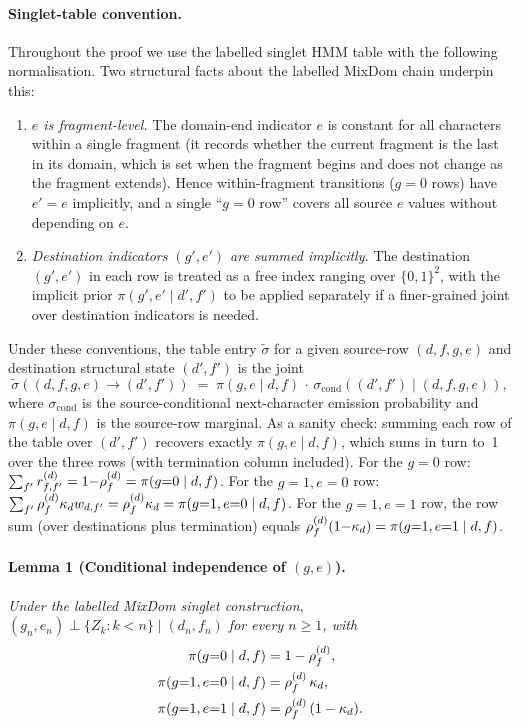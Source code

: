\paragraph{Singlet-table convention.}
Throughout the proof we use the labelled singlet HMM table with the
following normalisation. Two structural
facts about the labelled MixDom chain underpin this:
\begin{enumerate}[nosep, label=(\alph*)]
\item \emph{$e$ is fragment-level.} The domain-end indicator $e$
is constant for all characters within a single fragment (it
records whether the current fragment is the last in its domain,
which is set when the fragment begins and does not change as the
fragment extends). Hence within-fragment transitions ($g{=}0$
rows) have $e' = e$ implicitly, and a single ``$g{=}0$ row''
covers all source $e$ values without depending on $e$.
\item \emph{Destination indicators $(g', e')$ are summed implicitly.}
The destination $(g', e')$ in each row is treated as a free index
ranging over $\{0, 1\}^2$, with the implicit prior
$\pi(g', e' \mid d', f')$ to be applied separately if a
finer-grained joint over destination indicators is needed.
\end{enumerate}
Under these conventions, the table entry $\widetilde\sigma$ for a
given source-row $(d, f, g, e)$ and destination structural state
$(d', f')$ is the joint
\[
\widetilde\sigma((d, f, g, e) \to (d', f'))
\;=\; \pi(g, e \mid d, f)\,\cdot\,\sigma_{\text{cond}}((d', f')
\mid (d, f, g, e)),
\]
where $\sigma_{\text{cond}}$ is the source-conditional next-character
emission probability and $\pi(g, e \mid d, f)$ is the source-row
marginal. As a sanity check: summing each row of the table over
$(d', f')$ recovers exactly $\pi(g, e \mid d, f)$, which sums in turn
to~1 over the three rows (with termination column included).
For the $g{=}0$ row: $\sum_{f'} r^{(d)}_{f, f'} = 1{-}\rho^{(d)}_f
= \pi(g{=}0 \mid d, f)$. For the $g{=}1, e{=}0$ row:
$\sum_{f'} \rho^{(d)}_f \kappa_d w_{d, f'} = \rho^{(d)}_f
\kappa_d = \pi(g{=}1, e{=}0 \mid d, f)$. For the $g{=}1, e{=}1$ row,
the row sum (over destinations
plus termination) equals $\rho^{(d)}_f (1{-}\kappa_d)
= \pi(g{=}1, e{=}1 \mid d, f)$.

\paragraph{Lemma 1 (Conditional independence of $(g, e)$).}
\emph{Under the labelled MixDom singlet construction, $(g_n, e_n)
\perp \{Z_k : k < n\} \mid (d_n, f_n)$ for every $n \geq 1$, with}
\begin{align}
\label{eq:ge-prior}
\pi(g{=}0 \mid d, f) &= 1 - \rho^{(d)}_f, \\
\pi(g{=}1, e{=}0 \mid d, f) &= \rho^{(d)}_f \,\kappa_d, \\
\pi(g{=}1, e{=}1 \mid d, f) &= \rho^{(d)}_f\,(1 - \kappa_d).
\end{align}

